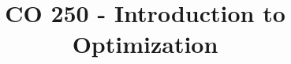 
\title{CO 250 - Introduction to Optimization}



\maketitle
 
\tableofcontents

\newpage













